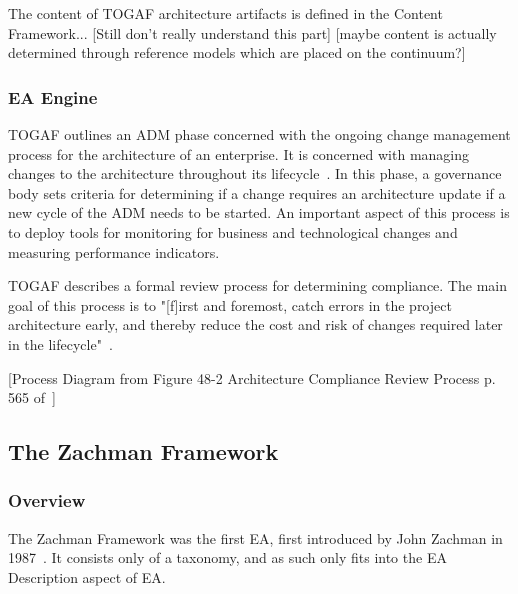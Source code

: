 The content of TOGAF architecture artifacts is defined in the Content Framework... [Still don't really understand this part] [maybe content is actually determined through reference models which are placed on the continuum?]

\subsubsection{EA Engine}

TOGAF outlines an ADM phase concerned with the ongoing change management process for the architecture of an enterprise.  It is concerned with managing changes to the architecture throughout its lifecycle~\cite{togaf9.1}. In this phase, a governance body sets criteria for determining if a change requires an architecture update if a new cycle of the ADM needs to be started. An important aspect of this process is to deploy tools for monitoring for business and technological changes and measuring performance indicators. 

TOGAF describes a formal review process for determining compliance. The main goal of this process is to "[f]irst and foremost, catch errors in the project architecture early, and thereby reduce the cost and risk of changes required later in the lifecycle"~\cite{togaf9.1}.

[Process Diagram from Figure 48-2 Architecture Compliance Review Process p. 565 of~\cite{togaf9.1}]



%


\subsection{The Zachman Framework}
\subsubsection{Overview}
The Zachman Framework was the first EA, first introduced by John Zachman in 1987~\cite{sessions2007,zachman}. It consists only of a taxonomy, and as such only fits into the EA Description aspect of EA. 


